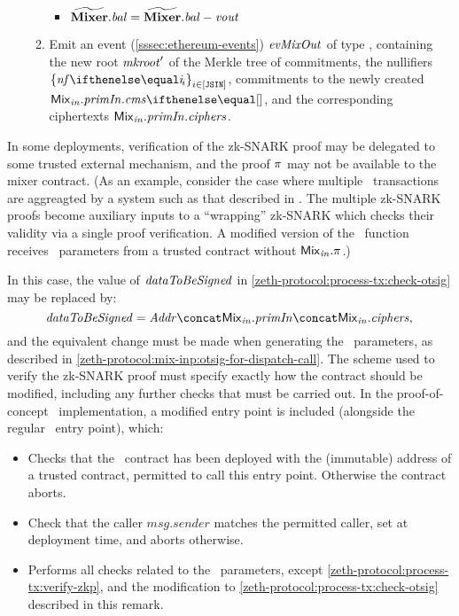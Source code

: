 \begin{enumerate}
\begin{enumerate}
\begin{itemize}
                    \item $\widetilde{\mathbf{Mixer}}.\mathit{bal} = \widetilde{\mathbf{Mixer}}.\mathit{bal} - \mathit{vout}$
                \end{itemize}
            \item Emit an event (\cref{sssec:ethereum-events}) $\mathit{evMixOut}$ of type \mixEventDType, containing the new root $\mathit{mkroot}'$ of the Merkle tree of commitments, the nullifiers $\indexedset{\nf{i}}{i \in [\jsin]}$, commitments to the newly created \zethnotes $\inp{\mix}.\primInp.\cms{}$, and the corresponding ciphertexts $\mathit{{\mathsf{Mix}}_{in}}.\mathit{primIn}.\mathit{ciphers}$.
        \end{enumerate}
\end{enumerate}

\begin{remark}\label{zeth-protocol:process-tx:dispatch-call}
  In some deployments, verification of the zk-SNARK proof may be delegated to some trusted external mechanism, and the proof $\mathit{\pi}$ may not be available to the mixer contract.  (As an example, consider the case where multiple \zeth~transactions are aggreagted by a system such as that described in \cite{rondelet2020zecale}. The multiple zk-SNARK proofs become auxiliary inputs to a ``wrapping'' zk-SNARK which checks their validity via a single proof verification. A modified version of the \mix~function receives \mix~parameters from a trusted contract without $\mathit{{\mathsf{Mix}}_{in}}.\mathit{\pi}$.)

  In this case, the value of $\mathit{dataToBeSigned}$ in \cref{zeth-protocol:process-tx:check-otsig} may be replaced by:
  \[
  \datatobesigned = \addr \concat \inp{\mix}.\primInp \concat \inp{\mix}.\ciphers, \\
  \]
  and the equivalent change must be made when generating the \mix~parameters, as described in \cref{zeth-protocol:mix-inp:otsig-for-dispatch-call}. The scheme used to verify the zk-SNARK proof must specify exactly how the contract should be modified, including any further checks that must be carried out. In the proof-of-concept \zeth~implementation, a modified entry point is included (alongside the regular \mix~entry point), which:
  \begin{itemize}
  \item Checks that the \mixer~contract has been deployed with the (immutable) address of a trusted contract, permitted to call this entry point. Otherwise the contract aborts.
  \item Check that the caller $msg.sender$ matches the permitted caller, set at deployment time, and aborts otherwise.
  \item Performs all checks related to the \mix~parameters, except \cref{zeth-protocol:process-tx:verify-zkp}, and the modification to \cref{zeth-protocol:process-tx:check-otsig} described in this remark.
  \end{itemize}


\end{remark}
